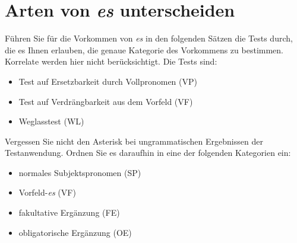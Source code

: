 
\section{Arten von \textit{es} unterscheiden}\label{sec:es}

Führen Sie für die Vorkommen von \textit{es} in den folgenden Sätzen die Tests durch, die es Ihnen erlauben, die genaue Kategorie des Vorkommens zu bestimmen.
Korrelate werden hier nicht berücksichtigt.
Die Tests sind:

\begin{itemize}\Lf
  \item Test auf Ersetzbarkeit durch Vollpronomen (VP)
  \item Test auf Verdrängbarkeit aus dem Vorfeld (VF)
  \item Weglasstest (WL)
\end{itemize}

Vergessen Sie nicht den Asterisk bei ungrammatischen Ergebnissen der Testanwendung.
Ordnen Sie es daraufhin in eine der folgenden Kategorien ein:

\begin{itemize}\Lf
  \item normales Subjektspronomen (SP)
  \item Vorfeld-\textit{es} (VF)
  \item fakultative Ergänzung (FE)
  \item obligatorische Ergänzung (OE)
\end{itemize}

